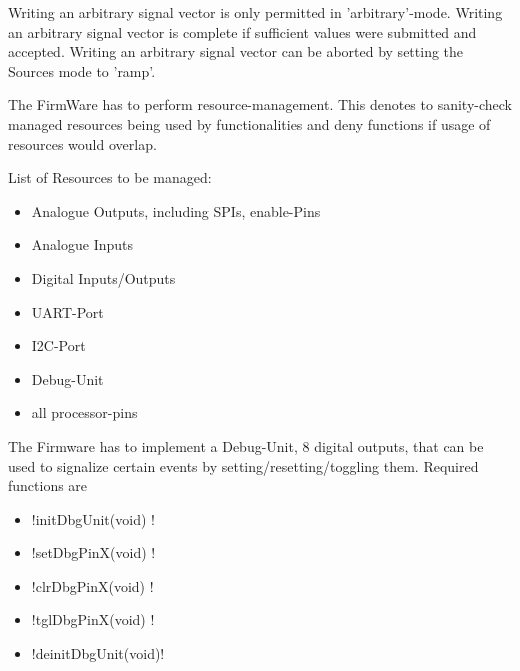 	{	Writing an arbitrary signal vector is only permitted in 'arbitrary'-mode. 
		Writing an arbitrary signal vector is complete if sufficient values were submitted and accepted.
		Writing an arbitrary signal vector can be aborted by setting the Sources mode to 'ramp'.
	}

	{ The FirmWare has to perform resource-management. This denotes to sanity-check managed resources being used by functionalities and deny functions if usage of resources would overlap.}

	{ List of Resources to be managed:
		\begin{itemize} \setlength\itemsep{2px}
			\item Analogue Outputs, including SPIs, enable-Pins
			\item Analogue Inputs
			\item Digital Inputs/Outputs
			\item UART-Port
			\item I2C-Port
			\item Debug-Unit
			\item all processor-pins
		\end{itemize}
	}

	{ The Firmware has to implement a Debug-Unit, 8 digital outputs, that can be used to signalize certain events by setting/resetting/toggling them.
		Required functions are 
		\begin{itemize} \setlength\itemsep{1px}
		\item \lstC !initDbgUnit(void)  !
		\item \lstC !setDbgPinX(void)   !
		\item \lstC !clrDbgPinX(void)   !
		\item \lstC !tglDbgPinX(void)   !
		\item \lstC !deinitDbgUnit(void)!
		\end{itemize}
	}

